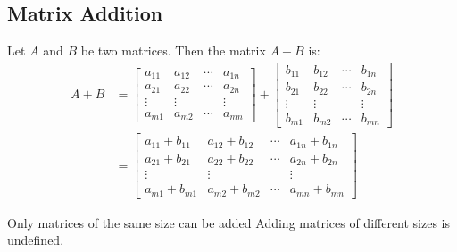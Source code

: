 \documentclass[../notes.tex]{subfiles}
\begin{document}
			\subsection{Matrix Addition}
				Let $A$ and $B$ be two matrices. Then the matrix $A + B$ is:
					\begin{align*}
						A + B &= \begin{bmatrix}
							a_{11} & a_{12} & \cdots & a_{1n}\\
							a_{21} & a_{22} & \cdots & a_{2n}\\
							\vdots & \vdots & & \vdots\\
							a_{m1} & a_{m2} & \cdots & a_{mn}
						\end{bmatrix} + \begin{bmatrix}
							b_{11} & b_{12} & \cdots & b_{1n}\\
							b_{21} & b_{22} & \cdots & b_{2n}\\
							\vdots & \vdots & & \vdots\\
							b_{m1} & b_{m2} & \cdots & b_{mn}
						\end{bmatrix}\\
						&= \begin{bmatrix}
							a_{11} + b_{11} & a_{12} + b_{12} & \cdots & a_{1n} + b_{1n}\\
							a_{21} + b_{21} & a_{22} + b_{22} & \cdots & a_{2n} + b_{2n}\\
							\vdots & \vdots & & \vdots\\
							a_{m1} + b_{m1} & a_{m2} + b_{m2} & \cdots & a_{mn} + b_{mn}
						\end{bmatrix}
					\end{align*}
					\begin{notebox}{Only matrices of the same size can be added}
						Adding matrices of different sizes is undefined.
					\end{notebox}
\end{document}
